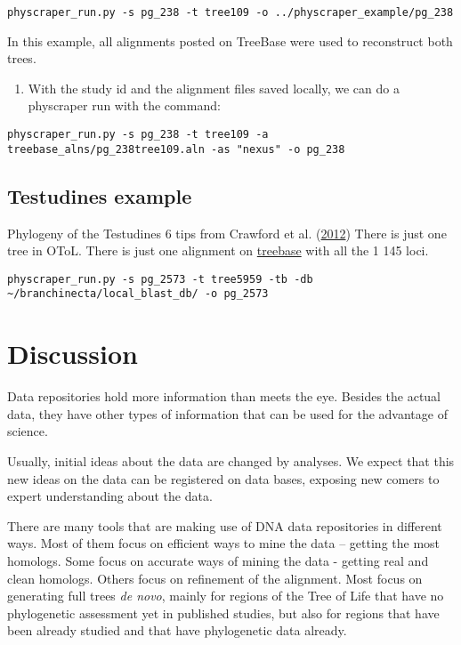 \documentclass[]{article}
\providecommand{\tightlist}{%
  \setlength{\itemsep}{0pt}\setlength{\parskip}{0pt}}
\begin{document}
\begin{verbatim}
physcraper_run.py -s pg_238 -t tree109 -o ../physcraper_example/pg_238
\end{verbatim}

In this example, all alignments posted on TreeBase were used to reconstruct both trees.

\begin{enumerate}
\def\labelenumi{\arabic{enumi}.}
\tightlist
\item
  With the study id and the alignment files saved locally, we can do a physcraper run with the command:
\end{enumerate}

\begin{verbatim}
physcraper_run.py -s pg_238 -t tree109 -a treebase_alns/pg_238tree109.aln -as "nexus" -o pg_238
\end{verbatim}

\hypertarget{testudines-example}{%
\subsection{Testudines example}\label{testudines-example}}

Phylogeny of the Testudines 6 tips from Crawford et al. (\protect\hyperlink{ref-crawford2012more}{2012})
There is just one tree in OToL.
There is just one alignment on \href{https://treebase.org/treebase-web/search/study/matrices.html?id=12742}{treebase} with all the 1 145 loci.

\begin{verbatim}
physcraper_run.py -s pg_2573 -t tree5959 -tb -db ~/branchinecta/local_blast_db/ -o pg_2573
\end{verbatim}

\hypertarget{discussion}{%
\section{Discussion}\label{discussion}}

Data repositories hold more information than meets the eye.
Besides the actual data, they have other types of information that can be used for the advantage of science.

Usually, initial ideas about the data are changed by analyses.
We expect that this new ideas on the data can be registered on data bases,
exposing new comers to expert understanding about the data.

There are many tools that are making use of DNA data repositories in different ways.
Most of them focus on efficient ways to mine the data -- getting the most homologs.
Some focus on accurate ways of mining the data - getting real and clean homologs.
Others focus on refinement of the alignment.
Most focus on generating full trees \emph{de novo}, mainly for regions of the Tree of
Life that have no phylogenetic assessment yet in published studies, but also for
regions that have been already studied and that have phylogenetic data already.
\end{document}
